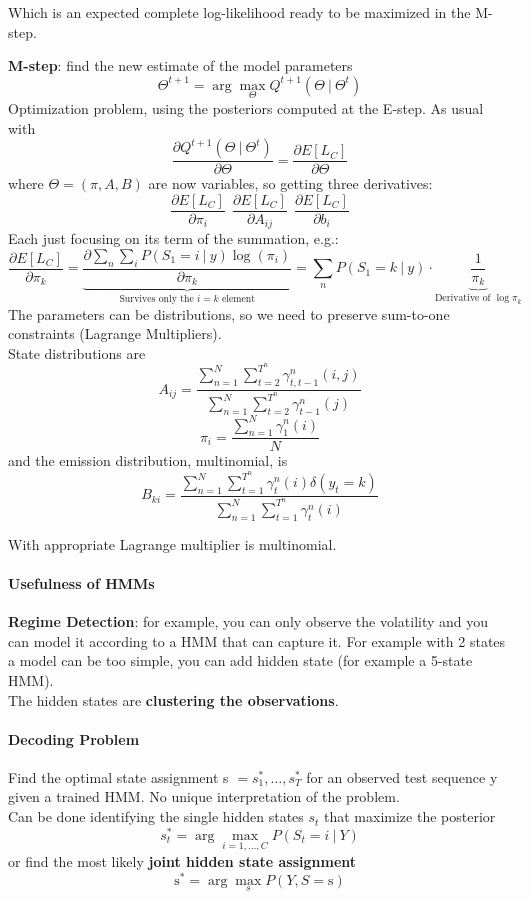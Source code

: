 \documentclass[10pt]{report}
\begin{document}
\begin{list}{}{}
	Which is an expected complete log-likelihood ready to be maximized in the M-step.
	\item \textbf{M-step}: find the new estimate of the model parameters $$\Theta^{t+1} = \arg\max_\Theta Q^{t+1}(\Theta\:|\:\Theta^t)$$
	Optimization problem, using the posteriors computed at the E-step. As usual with $$\frac{\partial Q^{t+1}(\Theta\:|\:\Theta^t)}{\partial\Theta}=\frac{\partial E[L_C]}{\partial\Theta}$$
	where $\Theta = (\pi, A, B)$ are now variables, so getting three derivatives:
			$$\frac{\partial E[L_C]}{\partial\pi_i}\:\:\frac{\partial E[L_C]}{\partial A_{ij}}\:\:\frac{\partial E[L_C]}{\partial b_i}$$
		Each just focusing on its term of the summation, e.g.:
			$$\frac{\partial E[L_C]}{\partial \pi_k}=\underset{\text{Survives only the }i=k\text{ element}}{\underbrace{\frac{\partial \sum_n\sum_iP(S_1=i\:|\:y)\log(\pi_i)}{\partial \pi_k}}} = \sum_nP(S_1=k\:|\:y)\cdot\underset{\text{Derivative of }\log\pi_k}{\underbrace{ \frac{1}{\pi_k}}}$$
	The parameters can be distributions, so we need to preserve sum-to-one constraints (Lagrange Multipliers).\\
	State distributions are
	$$A_{ij}=\frac{\sum_{n=1}^N\sum_{t=2}^{T^n} \gamma_{t,t-1}^n(i,j)}{\sum_{n=1}^N\sum_{t=2}^{T^n}\gamma_{t-1}^n(j)}$$
	$$\pi_i=\frac{\sum_{n=1}^N\gamma_1^n(i)}{N}$$
	and the emission distribution, multinomial, is
	$$B_{ki} = \frac{\sum_{n=1}^N\sum_{t=1}^{T^n}\gamma_t^n(i)\delta(y_t=k)}{\sum_{n=1}^N\sum_{t=1}^{T^n}\gamma_t^n(i)}$$
\end{list}
With appropriate Lagrange multiplier is multinomial.
\paragraph{Usefulness of HMMs}\begin{list}{}{}
	\item \textbf{Regime Detection}: for example, you can only observe the volatility and you can model it according to a HMM that can capture it. For example with 2 states a model can be too simple, you can add hidden state (for example a 5-state HMM).\\
	The hidden states are \textbf{clustering the observations}.
\end{list}
\paragraph{Decoding Problem} Find the optimal state assignment s $= s_1^*,\ldots,s_T^*$ for an observed test sequence y given a trained HMM. No unique interpretation of the problem.\\
Can be done identifying the single hidden states $s_t$ that maximize the posterior $$s_t^*=\arg\max_{i=1,\ldots,C}P(S_t=i\:|\:Y)$$ 
or find the most likely \textbf{joint hidden state assignment} 
$$\text{s}^* = \arg\max_s P(Y,S = \text{s})$$
\end{document}
